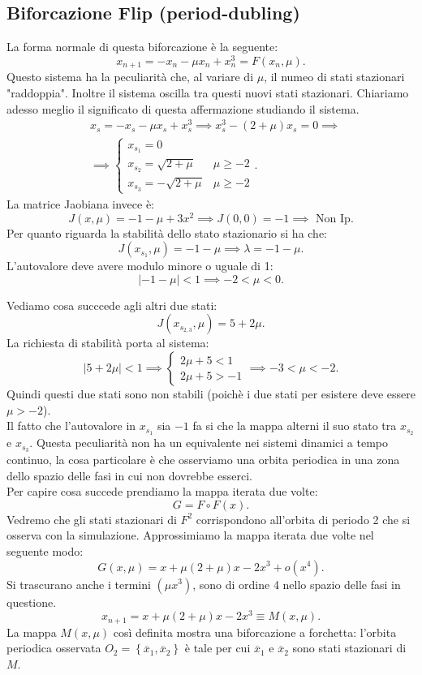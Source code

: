 \subsection{Biforcazione Flip (period-dubling)}%
La forma normale di questa biforcazione è la seguente:
\[
    x_{n+1}= -x_n - \mu x_n + x_n^3 = F(x_n, \mu) 
.\] 
Questo sistema ha la peculiarità che, al variare di $\mu$, il numeo di stati stazionari "raddoppia". Inoltre il sistema oscilla tra questi nuovi stati stazionari. Chiariamo adesso meglio il significato di questa affermazione studiando il sistema.
\[\begin{aligned}
    &x_s = - x_s - \mu x_s + x_s^3 \implies  x_s^3-(2 + \mu) x_s = 0\implies \\
    &\implies\begin{cases}
	x_{s_1} = 0 & \\
	x_{s_2}= \sqrt{2 + \mu} & \mu\ge -2\\
	x_{s_3}= -\sqrt{2 + \mu} & \mu  \ge -2
    \end{cases}
.\end{aligned}\]
La matrice Jaobiana invece è:
\[
    J(x, \mu) = -1 -\mu  + 3x^2 \implies  J(0 , 0) = -1 \implies  \text{ Non Ip.}
\] 
Per quanto riguarda la stabilità dello stato stazionario si ha che:
\[
    J(x_{s_1}, \mu) = -1-\mu\implies  \lambda  = -1-\mu
.\] 
L'autovalore deve avere modulo minore o uguale di 1:
\[
    \left|-1-\mu\right|<1 \implies  -2<\mu <0
.\] 

Vediamo cosa succcede agli altri due stati:
\[
    J(x_{s_{2, 3}}, \mu) = 5 + 2\mu
.\] 
La richiesta di stabilità porta al sistema:
\[
    \left|5 + 2\mu\right|< 1 \implies 
    \begin{cases}
        2\mu  + 5 < 1\\
	2\mu +5 > -1
    \end{cases}
    \implies 
    -3<\mu <-2
.\] 
Quindi questi due stati sono non stabili (poichè i due stati per esistere deve essere $\mu >-2$).\\
Il fatto che l'autovalore in $x_{s_1}$ sia $-1$ fa si che la mappa alterni il suo stato tra $x_{s_2}$ e $x_{s_3}$. Questa peculiarità non ha un equivalente nei sistemi dinamici a tempo continuo, la cosa particolare è che osserviamo una orbita periodica in una zona dello spazio delle fasi in cui non dovrebbe esserci.\\
Per capire cosa succede prendiamo la mappa iterata due volte:
\[
    G =F\circ F (x) 
.\] 
Vedremo che gli stati stazionari di $F^2$ corrispondono all'orbita di periodo 2 che si osserva con la simulazione. Approssimiamo la mappa iterata due volte nel seguente modo:
\[
    G(x, \mu) = x + \mu (2+\mu) x-2x^3 + o(x^4) 
.\] 
Si trascurano anche i termini $(\mu x^3)$, sono di ordine 4 nello spazio delle fasi in questione.
\[
    x_{n+1}= x + \mu (2+\mu) x-2x^3 \equiv M(x, \mu) 
.\] 
La mappa $M(x, \mu)$ così definita mostra una biforcazione a forchetta: l'orbita periodica osservata $O_2=\left\{\overline{x}_1, \overline{x}_2\right\}$ è tale per cui $\overline{x}_1$ e $\overline{x}_2$ sono stati stazionari di $M$.
